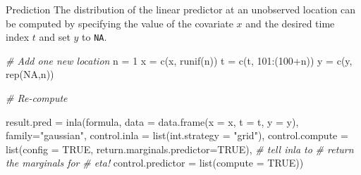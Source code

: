 \documentclass[
  handout]{beamer}
\newenvironment{Shaded}{\begin{snugshade}}{\end{snugshade}}
\newcommand{\AttributeTok}[1]{\textcolor[rgb]{0.77,0.63,0.00}{#1}}
\newcommand{\CommentTok}[1]{\textcolor[rgb]{0.56,0.35,0.01}{\textit{#1}}}
\newcommand{\ConstantTok}[1]{\textcolor[rgb]{0.00,0.00,0.00}{#1}}
\newcommand{\DecValTok}[1]{\textcolor[rgb]{0.00,0.00,0.81}{#1}}
\newcommand{\FunctionTok}[1]{\textcolor[rgb]{0.00,0.00,0.00}{#1}}
\newcommand{\NormalTok}[1]{#1}
\newcommand{\OtherTok}[1]{\textcolor[rgb]{0.56,0.35,0.01}{#1}}
\newcommand{\SpecialCharTok}[1]{\textcolor[rgb]{0.00,0.00,0.00}{#1}}
\newcommand{\StringTok}[1]{\textcolor[rgb]{0.31,0.60,0.02}{#1}}
\begin{document}
\begin{frame}[fragile]{Prediction}
\protect\hypertarget{prediction-1}{}
The distribution of the linear predictor at an unobserved location can
be computed by specifying the value of the covariate \(x\) and the
desired time index \(t\) and set \(y\) to \texttt{NA}.

\begin{Shaded}
\begin{Highlighting}[]
\CommentTok{\# Add one new location}
\NormalTok{n }\OtherTok{=} \DecValTok{1}
\NormalTok{x }\OtherTok{=} \FunctionTok{c}\NormalTok{(x, }\FunctionTok{runif}\NormalTok{(n))}
\NormalTok{t }\OtherTok{=} \FunctionTok{c}\NormalTok{(t, }\DecValTok{101}\SpecialCharTok{:}\NormalTok{(}\DecValTok{100}\SpecialCharTok{+}\NormalTok{n))}
\NormalTok{y }\OtherTok{=} \FunctionTok{c}\NormalTok{(y, }\FunctionTok{rep}\NormalTok{(}\ConstantTok{NA}\NormalTok{,n))}

\CommentTok{\# Re{-}compute}

\NormalTok{result.pred }\OtherTok{=} \FunctionTok{inla}\NormalTok{(formula,}
    \AttributeTok{data =} \FunctionTok{data.frame}\NormalTok{(}\AttributeTok{x =}\NormalTok{ x, }\AttributeTok{t =}\NormalTok{ t, }\AttributeTok{y =}\NormalTok{ y),}
    \AttributeTok{family=}\StringTok{"gaussian"}\NormalTok{,}
    \AttributeTok{control.inla =} \FunctionTok{list}\NormalTok{(}\AttributeTok{int.strategy =} \StringTok{"grid"}\NormalTok{),}
    \AttributeTok{control.compute =} \FunctionTok{list}\NormalTok{(}\AttributeTok{config =} \ConstantTok{TRUE}\NormalTok{, }
                           \AttributeTok{return.marginals.predictor=}\ConstantTok{TRUE}\NormalTok{), }\CommentTok{\# tell inla to }
                                                            \CommentTok{\# return the marginals for }
                                                            \CommentTok{\# eta!  }
    \AttributeTok{control.predictor =} \FunctionTok{list}\NormalTok{(}\AttributeTok{compute =} \ConstantTok{TRUE}\NormalTok{))}
\end{Highlighting}
\end{Shaded}
\end{frame}
\end{document}
